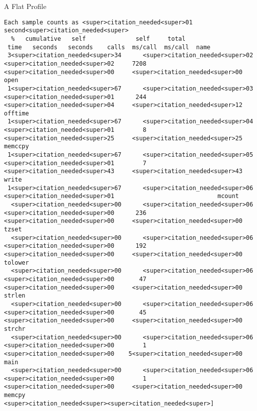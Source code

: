 \documentclass[11pt]{beamer}
\begin{document}


\begin{frame}[fragile = singleslide]{A Flat Profile}
\footnotesize
\begin{verbatim}
Each sample counts as <super>citation_needed<super>01 second<super>citation_needed<super>
  %   cumulative   self              self     total
 time   seconds   seconds    calls  ms/call  ms/call  name
 3<super>citation_needed<super>34      <super>citation_needed<super>02     <super>citation_needed<super>02     7208     <super>citation_needed<super>00     <super>citation_needed<super>00  open
 1<super>citation_needed<super>67      <super>citation_needed<super>03     <super>citation_needed<super>01      244     <super>citation_needed<super>04     <super>citation_needed<super>12  offtime
 1<super>citation_needed<super>67      <super>citation_needed<super>04     <super>citation_needed<super>01        8     <super>citation_needed<super>25     <super>citation_needed<super>25  memccpy
 1<super>citation_needed<super>67      <super>citation_needed<super>05     <super>citation_needed<super>01        7     <super>citation_needed<super>43     <super>citation_needed<super>43  write
 1<super>citation_needed<super>67      <super>citation_needed<super>06     <super>citation_needed<super>01                             mcount
  <super>citation_needed<super>00      <super>citation_needed<super>06     <super>citation_needed<super>00      236     <super>citation_needed<super>00     <super>citation_needed<super>00  tzset
  <super>citation_needed<super>00      <super>citation_needed<super>06     <super>citation_needed<super>00      192     <super>citation_needed<super>00     <super>citation_needed<super>00  tolower
  <super>citation_needed<super>00      <super>citation_needed<super>06     <super>citation_needed<super>00       47     <super>citation_needed<super>00     <super>citation_needed<super>00  strlen
  <super>citation_needed<super>00      <super>citation_needed<super>06     <super>citation_needed<super>00       45     <super>citation_needed<super>00     <super>citation_needed<super>00  strchr
  <super>citation_needed<super>00      <super>citation_needed<super>06     <super>citation_needed<super>00        1     <super>citation_needed<super>00    5<super>citation_needed<super>00  main
  <super>citation_needed<super>00      <super>citation_needed<super>06     <super>citation_needed<super>00        1     <super>citation_needed<super>00     <super>citation_needed<super>00  memcpy
<super>citation_needed<super><super>citation_needed<super>]
\end{verbatim}
\end{frame}
\end{document}
